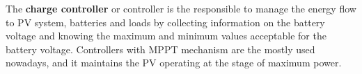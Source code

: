 \documentclass[review]{elsarticle}
\begin{document}
%
%
%
%

The \textbf{charge controller} or controller is the responsible to manage the energy flow to PV system, batteries and loads by collecting information on the battery voltage and knowing the maximum and minimum values acceptable for the battery voltage. Controllers with MPPT mechanism are the mostly used nowadays,  and it maintains the PV operating at the stage of maximum power. %
%
%
%
%
%
\end{document}
